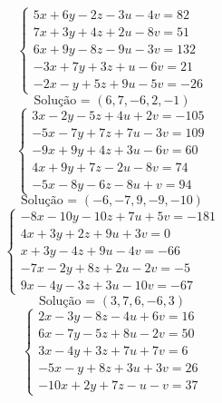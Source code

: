 \documentclass[12pt,oneside,a4paper,fleqn]{article}
\begin{document}
\begin{multicols*}{2}
\begin{equation*}
\begin{cases}
5x+6y-2z-3u-4v=82 \\
7x+3y+4z+2u-8v=51 \\
6x+9y-8z-9u-3v=132 \\
-3x+7y+3z+u-6v=21 \\
-2x-y+5z+9u-5v=-26
\end{cases}
\end{equation*}
\begin{equation*}
\text{Solução = }\left(6,7,-6,2,-1\right)
\end{equation*}
\vspace{\baselineskip}
\begin{equation*}
\begin{cases}
3x-2y-5z+4u+2v=-105 \\
-5x-7y+7z+7u-3v=109 \\
-9x+9y+4z+3u-6v=60 \\
4x+9y+7z-2u-8v=74 \\
-5x-8y-6z-8u+v=94
\end{cases}
\end{equation*}
\begin{equation*}
\text{Solução = }\left(-6,-7,9,-9,-10\right)
\end{equation*}
\vspace{\baselineskip}
\begin{equation*}
\begin{cases}
-8x-10y-10z+7u+5v=-181 \\
4x+3y+2z+9u+3v=0 \\
x+3y-4z+9u-4v=-66 \\
-7x-2y+8z+2u-2v=-5 \\
9x-4y-3z+3u-10v=-67
\end{cases}
\end{equation*}
\begin{equation*}
\text{Solução = }\left(3,7,6,-6,3\right)
\end{equation*}
\vspace{\baselineskip}
\begin{equation*}
\begin{cases}
2x-3y-8z-4u+6v=16 \\
6x-7y-5z+8u-2v=50 \\
3x-4y+3z+7u+7v=6 \\
-5x-y+8z+3u+3v=26 \\
-10x+2y+7z-u-v=37
\end{cases}
\end{equation*}
\begin{equation*}

\end{equation*}
\end{multicols*}
\end{document}
